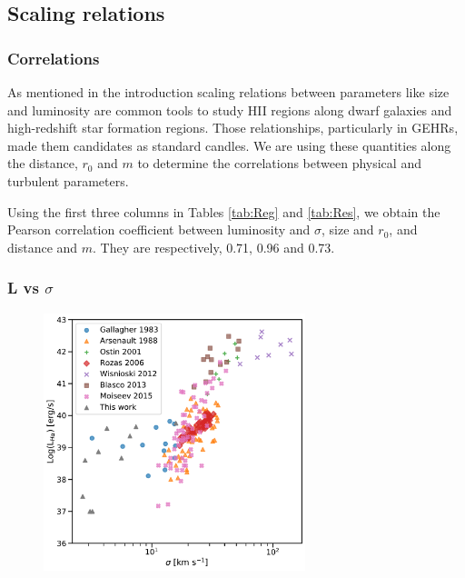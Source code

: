 \documentclass[fleqn,usenatbib, useAMS, a4paper]{mnras}
\begin{document}
\subsection{Scaling relations}

\subsubsection{Correlations}

As mentioned in the introduction scaling relations between parameters like size and luminosity are common tools to study HII regions along dwarf galaxies and high-redshift star formation regions. Those relationships, particularly in GEHRs, made them candidates as standard candles. We are using these quantities along the distance, \(r_0\) and \(m\) to determine the correlations between physical and turbulent parameters.

Using the first three columns in Tables \ref{tab:Reg} and \ref{tab:Res}, we obtain the Pearson correlation coefficient between luminosity and \(\sigma\), size and \(r_0\), and distance and \(m\). They are respectively, 0.71, 0.96 and 0.73.

\subsubsection{L vs \(\sigma\)}

\begin{figure}
\centering 
\includegraphics[width=3in]{Figures/lvss.pdf}
\caption{}
\label{fig:}
\end{figure}

\end{document}
